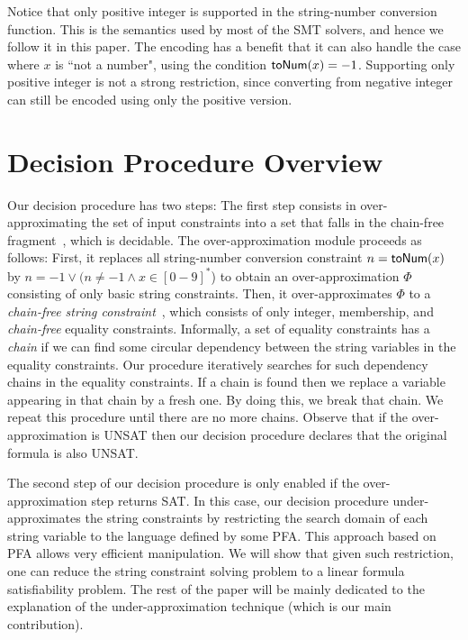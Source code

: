 \documentclass[sigplan,screen]{acmart}
\begin{document}
Notice that only positive integer is supported in the string-number conversion function. This is the semantics used by most of the SMT solvers, and hence we follow it in this paper. The encoding has a benefit that it can also handle the case where $x$ is ``not a number", using the condition $\mbox{\textsf{toNum}($x$)} = -1$.
Supporting only positive integer is not a strong restriction, since converting from negative integer can still be encoded using only the positive  version. 


\section{Decision Procedure Overview} \label{section:over}


Our decision procedure has two steps: The first step consists in over-approximating the set of input constraints into a set that falls in the chain-free fragment~\cite{abdulla2019chain}, which is decidable. 
The over-approximation module proceeds as follows: First,  it replaces all string-number conversion constraint $n=\mbox{\textsf{toNum}($x$)}$ by $n=-1 \vee (n\neq -1 \wedge x\in [0-9]^*$) to obtain an over-approximation $\Phi$ consisting of only basic string constraints. 
Then, it over-approximates $\Phi$ to a \emph{chain-free string constraint}~\cite{abdulla2019chain}, 
which  consists of only integer, membership, and \emph{chain-free} equality constraints. Informally, a set of equality constraints has a \emph{chain} if we can find some circular dependency between the string variables in the equality constraints.
Our procedure iteratively searches for such dependency chains in the equality constraints. If a chain is found then we replace a variable appearing in that chain by a  fresh one. By doing this, we  break  that chain. We   repeat this procedure until there are no more chains. Observe that if the over-approximation is UNSAT then our decision procedure  declares that the original formula is also UNSAT.




The second step of our decision procedure is only enabled if the over-approximation step returns SAT. In this case, our decision procedure  under-approximates the string constraints by restricting the search domain of each string variable to the language defined by some PFA. This approach based on PFA allows very efficient manipulation. We will show that given such restriction, one can reduce the string constraint solving problem to a linear formula satisfiability problem. The rest of the paper will be mainly dedicated to the explanation of the under-approximation technique (which is our main contribution).
\end{document}
